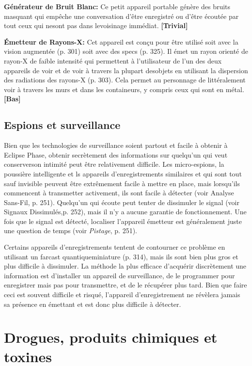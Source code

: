 \textbf{Générateur de Bruit Blanc:} Ce petit appareil portable génère des bruits masquant qui empêche une conversation d'être enregistré ou d'être écoutée par tout ceux qui nesont pas dans levoisinage immédiat. \textbf{[Trivial]} 

\textbf{Émetteur de Rayons-X:} Cet appareil est conçu pour être utilisé soit avec la vision augmentée (p. 301) soit avec des specs (p. 325). Il émet un rayon orienté de rayon-X de faible intensité qui permettent à l'utilisateur de l'un des deux appareils de voir et de voir à travers la plupart desobjets en utilisant la dispersion des radiations des rayons-X (p. 303). Cela permet au personnage de littéralement voir à travers les murs et dans les containeurs, y compris ceux qui sont en métal. \textbf{[Bas]} 

\subsection{Espions et surveillance} \label{sec:bugs-surveilance} 

Bien que les technologies de surveillance soient partout et facile à obtenir à Eclipse Phase, obtenir secrètement des informations sur quelqu'un qui veut conserverson intimité peut être relativement difficile. Les micro-espions, la poussière intelligente et ls appareils d'enregistrements similaires et qui sont tout sauf invisible peuvent être extrêmement facile à mettre en place, mais lorsqu'ils commencent à transmetter activement, ils sont facile à détecter (voir Analyse Sans-Fil, p. 251). Quelqu'un qui écoute peut tenter de dissimuler le signal (voir Signaux Dissimulés,p. 252), mais il n'y a aucune garantie de fonctionnement. Une fois que le signal est détecté, localiser l'appareil émetteur est généralement juste une question de temps (voir \textit{Pistage}, p. 251). 

Certains appareils d'enregistrements tentent de contourner ce problème en utilisant un farcast quantiqueminiature (p. 314), mais ils sont bien plus gros et plus difficile à dissimuler. La méthode la plus efficace d'acquérir discrètement une information est d'installer un appareil de surveillance, de le programmer pour enregistrer mais pas pour transmettre, et de le récupérer plus tard. Bien que faire ceci est souvent difficile et risqué, l'appareil d'enregistrement ne révèlera jamais sa présence en émettant et est donc plus difficile à détecter. 

\section{Drogues, produits chimiques et toxines} \label{sec:drugs-chemicals-toxins} 

